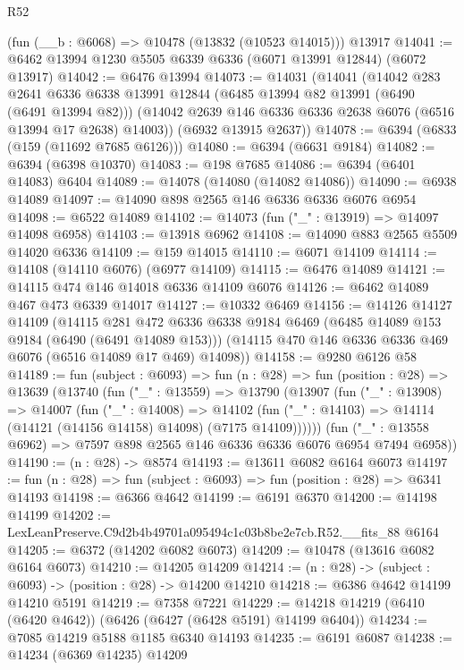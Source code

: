 \begin{lexlean}{R52}
\begin{coremodule}
    (fun (__b : @6068) => @10478 (@13832 (@10523 @14015)))
    @13917
@14041 := @6462 @13994 @1230 @5505 @6339 @6336 (@6071 @13991 @12844) (@6072 @13917)
@14042 := @6476 @13994
@14073 := @14031
    (@14041
      (@14042
        @283
        @2641
        @6336
        @6338
        @13991
        @12844
        (@6485 @13994 @82 @13991 (@6490 (@6491 @13994 @82)))
        (@14042 @2639 @146 @6336 @6336 @2638 @6076 (@6516 @13994 @17 @2638) @14003))
      (@6932 @13915 @2637))
@14078 := @6394 (@6833 (@159 (@11692 @7685 @6126)))
@14080 := @6394 (@6631 @9184)
@14082 := @6394 (@6398 @10370)
@14083 := @198 @7685
@14086 := @6394 (@6401 @14083) @6404
@14089 := @14078 (@14080 (@14082 @14086))
@14090 := @6938 @14089
@14097 := @14090 @898 @2565 @146 @6336 @6336 @6076 @6954
@14098 := @6522 @14089
@14102 := @14073 (fun ("_" : @13919) => @14097 @14098 @6958)
@14103 := @13918 @6962
@14108 := @14090 @883 @2565 @5509 @14020 @6336
@14109 := @159 @14015
@14110 := @6071 @14109
@14114 := @14108 (@14110 @6076) (@6977 @14109)
@14115 := @6476 @14089
@14121 := @14115 @474 @146 @14018 @6336 @14109 @6076
@14126 := @6462 @14089 @467 @473 @6339 @14017
@14127 := @10332 @6469
@14156 := @14126
    @14127
    @14109
    (@14115
      @281
      @472
      @6336
      @6338
      @9184
      @6469
      (@6485 @14089 @153 @9184 (@6490 (@6491 @14089 @153)))
      (@14115 @470 @146 @6336 @6336 @469 @6076 (@6516 @14089 @17 @469) @14098))
@14158 := @9280 @6126 @58
@14189 := fun (subject : @6093) =>
  fun (n : @28) =>
  fun (position : @28) =>
  @13639
    (@13740
      (fun ("_" : @13559) =>
      @13790
        (@13907
          (fun ("_" : @13908) =>
          @14007
            (fun ("_" : @14008) =>
            @14102 (fun ("_" : @14103) => @14114 (@14121 (@14156 @14158) @14098) (@7175 @14109))))))
      (fun ("_" : @13558 @6962) => @7597 @898 @2565 @146 @6336 @6336 @6076 @6954 @7494 @6958))
@14190 := (n : @28) -> @8574
@14193 := @13611 @6082 @6164 @6073
@14197 := fun (n : @28) => fun (subject : @6093) => fun (position : @28) => @6341 @14193
@14198 := @6366 @4642
@14199 := @6191 @6370
@14200 := @14198 @14199
@14202 := LexLeanPreserve.C9d2b4b49701a095494c1c03b8be2e7cb.R52.__fits_88 @6164
@14205 := @6372 (@14202 @6082 @6073)
@14209 := @10478 (@13616 @6082 @6164 @6073)
@14210 := @14205 @14209
@14214 := (n : @28) -> (subject : @6093) -> (position : @28) -> @14200 @14210
@14218 := @6386 @4642 @14199 @14210 @5191
@14219 := @7358 @7221
@14229 := @14218 @14219 (@6410 (@6420 @4642)) (@6426 (@6427 (@6428 @5191) @14199 @6404))
@14234 := @7085 @14219 @5188 @1185 @6340 @14193
@14235 := @6191 @6087
@14238 := @14234 (@6369 @14235) @14209

\end{coremodule}
\end{lexlean}

